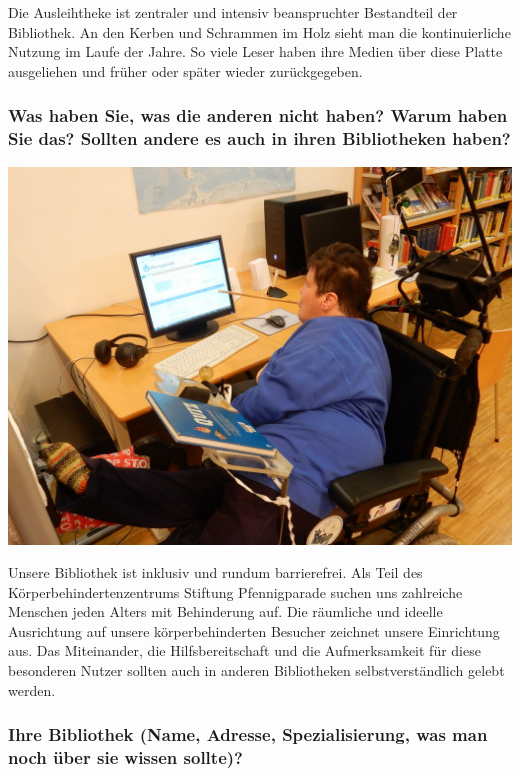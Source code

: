 Die Ausleihtheke ist zentraler und intensiv beanspruchter Bestandteil
der Bibliothek. An den Kerben und Schrammen im Holz sieht man die
kontinuierliche Nutzung im Laufe der Jahre. So viele Leser haben ihre
Medien über diese Platte ausgeliehen und früher oder später wieder
zurückgegeben.

\hypertarget{was-haben-sie-was-die-anderen-nicht-haben-warum-haben-sie-das-sollten-andere-es-auch-in-ihren-bibliotheken-haben}{%
\subsubsection*{Was haben Sie, was die anderen nicht haben? Warum haben Sie
das? Sollten andere es auch in ihren Bibliotheken
haben?}\label{was-haben-sie-was-die-anderen-nicht-haben-warum-haben-sie-das-sollten-andere-es-auch-in-ihren-bibliotheken-haben}}

\begin{center}
\includegraphics{stiftung-pfennigparade/img/besondere-nutzerin.jpg}
\end{center}

Unsere Bibliothek ist inklusiv und rundum barrierefrei. Als Teil des
Körperbehindertenzentrums Stiftung Pfennigparade suchen uns zahlreiche
Menschen jeden Alters mit Behinderung auf. Die räumliche und ideelle
Ausrichtung auf unsere körperbehinderten Besucher zeichnet unsere
Einrichtung aus. Das Miteinander, die Hilfsbereitschaft und die
Aufmerksamkeit für diese besonderen Nutzer sollten auch in anderen
Bibliotheken selbstverständlich gelebt werden.

\hypertarget{ihre-bibliothek-name-adresse-spezialisierung-was-man-noch-uxfcber-sie-wissen-sollte}{%
\subsubsection*{Ihre Bibliothek (Name, Adresse, Spezialisierung, was man noch
über sie wissen
sollte)?}\label{ihre-bibliothek-name-adresse-spezialisierung-was-man-noch-uxfcber-sie-wissen-sollte}}


